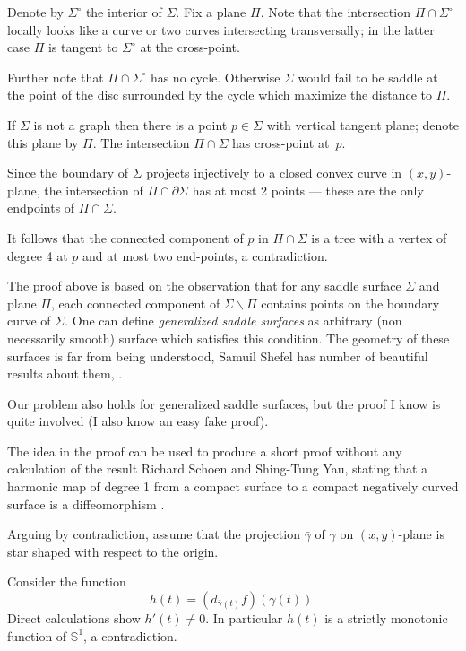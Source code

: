 Denote by $\Sigma^\circ$ the interior of $\Sigma$.
Fix a plane $\Pi$. 
Note that the intersection $\Pi\cap \Sigma^\circ$ 
locally  looks like a curve or two curves intersecting transversally;
in the latter case $\Pi$ is tangent to $\Sigma^\circ$ at the cross-point.

Further note that $\Pi\cap \Sigma^\circ$ has no cycle.
Otherwise $\Sigma$ would fail to be saddle at the point of the disc surrounded by the cycle which maximize the distance to $\Pi$.

If $\Sigma$ is not a graph then there is a point $p\in\Sigma$ with vertical tangent plane;
denote this plane by $\Pi$.
The intersection $\Pi\cap\Sigma$ has cross-point at~$p$.

Since the boundary of $\Sigma$ projects injectively to a closed convex curve in $(x,y)$-plane,
the intersection of $\Pi\cap\partial \Sigma$ has at most 2 points --- these are the only endpoints of $\Pi\cap\Sigma$.

It follows that the connected component of $p$ in $\Pi\cap\Sigma$ is a tree 
with a vertex of degree 4 at $p$ and at most two end-points, a contradiction.\qeds

The proof above is based on the observation 
that for any saddle surface $\Sigma$ and plane $\Pi$,
each connected component of $\Sigma\backslash \Pi$ contains points on the boundary curve of $\Sigma$.
One can define \emph{generalized saddle surfaces} as arbitrary (non necessarily smooth) surface which satisfies this condition.
The geometry of these surfaces is far from being understood,
Samuil Shefel has number of beautiful results about them, 
\cite[see][and references there in]{shefel}.

Our problem also holds for generalized  saddle surfaces, but the proof I know is quite involved (I also know an easy fake proof).

The idea in the proof can be used to produce a short proof without any calculation of the result Richard Schoen and Shing-Tung  Yau, stating that a harmonic map of degree 1 from a compact surface to a compact negatively curved surface is a diffeomorphism \cite[see][]{schoen-yau-2D}. 


Arguing by contradiction, assume that the projection $\bar\gamma$
of $\gamma$ on $(x, y)$-plane is star shaped with respect to the origin.

Consider the function 
$$h(t)=(d_{\bar\gamma(t)}f)(\gamma(t)).$$
Direct calculations show $h'(t)\ne 0$.
In particular $h(t)$ is a strictly monotonic function of $\mathbb{S}^1$, a contradiction.\qeds

